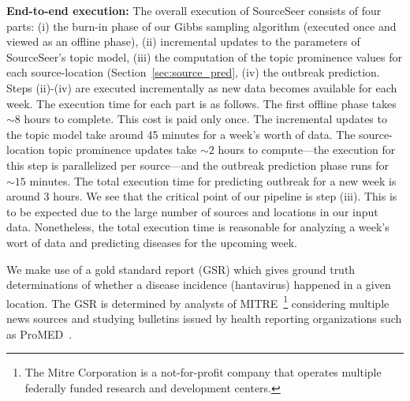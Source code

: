 \documentclass[twoside,leqno,twocolumn]{article}
\newcommand{\fullmodel}{{{\sf SourceSeer}}\xspace}
\begin{document}
\noindent\textbf{End-to-end execution:} The overall execution of \fullmodel consists of four parts: (i) the burn-in phase of our Gibbs sampling algorithm (executed once and viewed as an offline phase), (ii) incremental updates to the parameters of \fullmodel's topic model, (iii) the computation of the topic prominence values for each source-location (Section~\ref{sec:source_pred}, (iv) the outbreak prediction. Steps (ii)-(iv) are executed incrementally as new data becomes available for each week. The execution time for each part is as follows. The first offline phase takes $\sim8$ hours to complete. This cost is paid only once. The incremental updates to the topic model take around 45 minutes for a week's worth of data. The source-location topic prominence updates take $\sim2$ hours to compute---the execution for this step is parallelized per source---and the outbreak prediction phase runs for $\sim15$ minutes. The total execution time for predicting outbreak for a new week is around $3$ hours. We see that the critical point of our pipeline is step (iii). This is to be expected due to the large number of sources and locations in our input data. Nonetheless, the total execution time is reasonable for analyzing a week's wort of data and predicting diseases for the upcoming week.

\vspace{5pt} We make use of a gold standard report (GSR) which
gives ground truth determinations of whether a disease incidence
(hantavirus) happened in a given location. The GSR is determined by
analysts of MITRE~\footnote{The Mitre Corporation is a not-for-profit company that operates multiple federally funded research and development centers.} considering multiple news sources and studying bulletins issued by health reporting organizations such as ProMED~\cite{probmed}.
\end{document}
